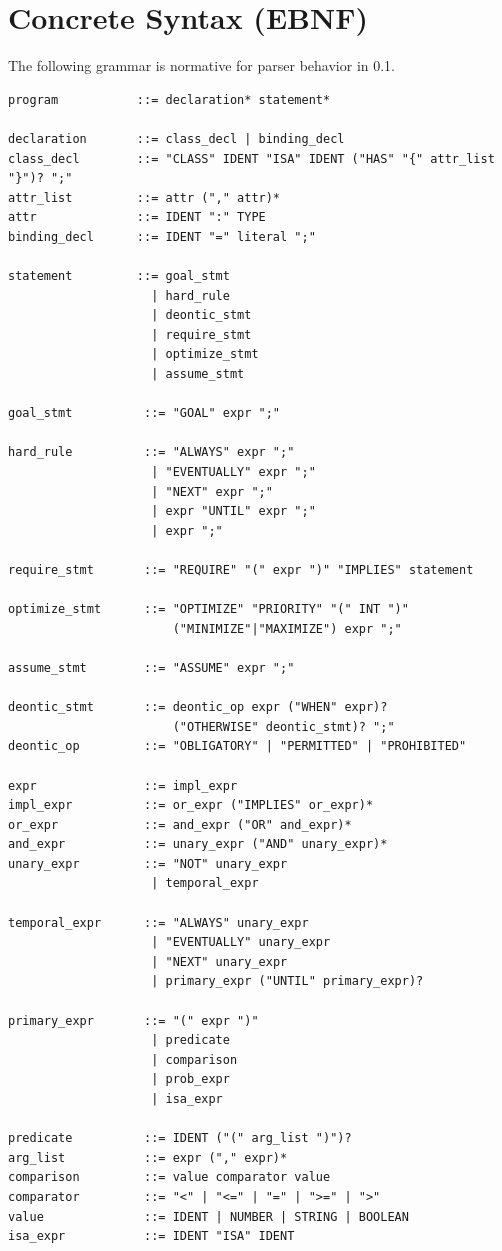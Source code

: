 \documentclass[11pt,a4paper]{article}
\begin{document}
\section{Concrete Syntax (EBNF)}
The following grammar is normative for parser behavior in 0.1.

\begin{lstlisting}
program           ::= declaration* statement*

declaration       ::= class_decl | binding_decl
class_decl        ::= "CLASS" IDENT "ISA" IDENT ("HAS" "{" attr_list "}")? ";"
attr_list         ::= attr ("," attr)*
attr              ::= IDENT ":" TYPE
binding_decl      ::= IDENT "=" literal ";"

statement         ::= goal_stmt
                    | hard_rule
                    | deontic_stmt
                    | require_stmt
                    | optimize_stmt
                    | assume_stmt

goal_stmt          ::= "GOAL" expr ";"

hard_rule          ::= "ALWAYS" expr ";"
                    | "EVENTUALLY" expr ";"
                    | "NEXT" expr ";"
                    | expr "UNTIL" expr ";"
                    | expr ";"

require_stmt       ::= "REQUIRE" "(" expr ")" "IMPLIES" statement

optimize_stmt      ::= "OPTIMIZE" "PRIORITY" "(" INT ")"
                       ("MINIMIZE"|"MAXIMIZE") expr ";"

assume_stmt        ::= "ASSUME" expr ";"

deontic_stmt       ::= deontic_op expr ("WHEN" expr)?
                       ("OTHERWISE" deontic_stmt)? ";"
deontic_op         ::= "OBLIGATORY" | "PERMITTED" | "PROHIBITED"

expr               ::= impl_expr
impl_expr          ::= or_expr ("IMPLIES" or_expr)*
or_expr            ::= and_expr ("OR" and_expr)*
and_expr           ::= unary_expr ("AND" unary_expr)*
unary_expr         ::= "NOT" unary_expr
                    | temporal_expr

temporal_expr      ::= "ALWAYS" unary_expr
                    | "EVENTUALLY" unary_expr
                    | "NEXT" unary_expr
                    | primary_expr ("UNTIL" primary_expr)?

primary_expr       ::= "(" expr ")"
                    | predicate
                    | comparison
                    | prob_expr
                    | isa_expr

predicate          ::= IDENT ("(" arg_list ")")?
arg_list           ::= expr ("," expr)*
comparison         ::= value comparator value
comparator         ::= "<" | "<=" | "=" | ">=" | ">"
value              ::= IDENT | NUMBER | STRING | BOOLEAN
isa_expr           ::= IDENT "ISA" IDENT


\end{lstlisting}
\end{document}
